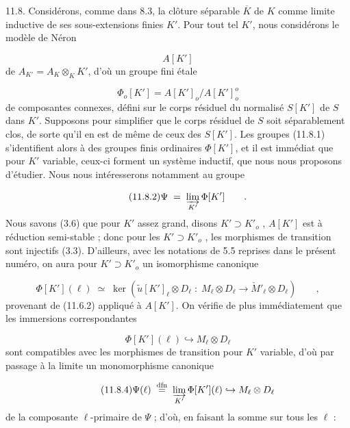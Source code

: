 11.8. Considérons, comme dans 8.3, la clôture séparable $\overline{K}$ de $K$ comme limite inductive de ses sous-extensions finies $K'$. Pour tout tel $K'$, nous considérons le modèle de Néron

\begin{equation*}
A[K']
\end{equation*}
de $A_{K'} = A_K \otimes_K K'$, d'où un groupe fini étale

\begin{equation}\tag{11.8.1}
\Phi_o[K'] = A[K']_o/A[K']_o^o
\end{equation}
de composantes connexes, défini sur le corps résiduel du normalisé $S[K']$ de $S$ dans $K'$. Supposons pour simplifier que le corps résiduel de $S$ soit séparablement clos, de sorte qu'il en est de même de ceux des $S[K']$. Les groupes (11.8.1) s'identifient alors à des groupes finis ordinaires $\Phi[K']$, et il est immédiat que pour $K'$ variable, ceux-ci forment un système inductif, que nous nous proposons d'étudier. Nous nous intéresserons notamment au groupe



\begin{equation}\tag{11.8.2}
\Psi \;=\; \varinjlim_{K'} \Phi[K'] \qquad .
\end{equation}
Nous savons (3.6) que pour $K'$ assez grand, disons $K' \supset K'_o$ , $A[K']$ est à réduction semi-stable ; donc pour les $K' \supset K'_o$ , les morphismes de transition sont injectifs (3.3). D'ailleurs, avec les notations de 5.5 reprises dans le présent numéro, on aura pour $K' \supset K'_o$ un isomorphisme canonique

\begin{equation}\tag{11.8.3}
\Phi[K'](\ell) \;\simeq\; \ker(\widetilde{u}[K']_\ell \otimes D_\ell \;:\; M_\ell \otimes D_\ell \longrightarrow \check{M}'_\ell \otimes D_\ell) \qquad ,
\end{equation}
provenant de (11.6.2) appliqué à $A[K']$. On vérifie de plus immédiatement que les immersions correspondantes

\begin{equation*}
\Phi[K'](\ell) \hookrightarrow M_\ell \otimes D_\ell
\end{equation*}
sont compatibles avec les morphismes de transition pour $K'$ variable, d'où par passage à la limite un monomorphisme canonique

\begin{equation}\tag{11.8.4}
\Psi(\ell) \;\overset{\mathrm{dfn}}{=}\; \varinjlim_{K'} \Phi[K'](\ell) \hookrightarrow M_\ell \otimes D_\ell
\end{equation}
de la composante $\ell$-primaire de $\Psi$ ; d'où, en faisant la somme sur tous les $\ell$ :

